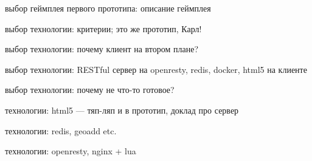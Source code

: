 \documentclass[aspectratio=169,handout,bigger]{beamer}
\begin{document}

\begin{frame}{выбор геймплея первого прототипа: описание геймплея}
\end{frame}


\begin{frame}{выбор технологии: критерии; это же прототип, Карл!}
\end{frame}


\begin{frame}{выбор технологии: почему клиент на втором плане?}
\end{frame}


\begin{frame}{выбор технологии: RESTful сервер на openresty, redis, docker, html5 на клиенте}
\end{frame}


\begin{frame}{выбор технологии: почему не что-то готовое?}
\end{frame}


\begin{frame}{технологии: html5 --- тяп-ляп и в прототип, доклад про сервер}
\end{frame}


\begin{frame}{технологии: redis, geoadd etc.}
\end{frame}


\begin{frame}{технологии: openresty, nginx + lua}
\end{frame}

\end{document}

